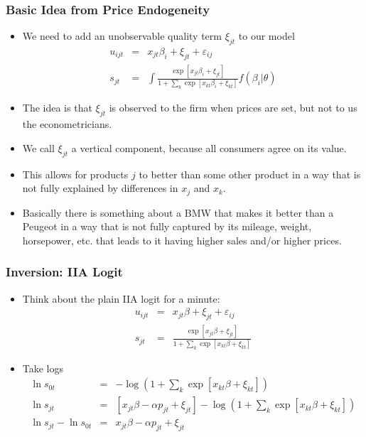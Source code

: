 \documentclass[xcolor=pdftex,dvipsnames,table,mathserif,aspectratio=169]{beamer}
\begin{document}
\begin{frame}
\frametitle{Basic Idea from Price Endogeneity}
 \begin{itemize}
\item We need to add an unobservable quality term $\xi_{jt}$ to our model
\begin{eqnarray*}
u_{ijt} &=& x_{jt} \beta_i + \xi_{jt} +  \varepsilon_{ij} \\
s_{jt} &=& \int \frac{\exp[x_{jt} \beta_i + \xi_{jt} ]}{1+\sum_k \exp[x_{kt} \beta_i + \xi_{kt} ]} f(\beta_i | \theta)
\end{eqnarray*}
\item The idea is that $\xi_{jt}$ is observed to the firm when prices are set, but not to us the econometricians.
\item We call $\xi_{jt}$ a vertical component, because all consumers agree on its value.
\item This allows for products $j$ to better than some other product in a way that is not fully explained by differences in $x_j$ and $x_k$.
\item Basically there is something about a BMW that makes it better than a Peugeot in a way that is not fully captured by its mileage, weight, horsepower, etc. that leads to it having higher sales and/or higher prices.
 \end{itemize}
\end{frame}

\begin{frame}
\frametitle{Inversion: IIA Logit}
 \begin{itemize}
\item Think about the plain IIA logit for a minute:
\begin{eqnarray*}
u_{ijt} &=& x_{jt} \beta + \xi_{jt} +  \varepsilon_{ij} \\
s_{jt} &=& \frac{\exp[x_{jt} \beta + \xi_{jt} ]}{1+\sum_k \exp[x_{kt} \beta + \xi_{kt} ]} 
\end{eqnarray*}
\item Take logs
\begin{eqnarray*}
\ln s_{0t} &=& -\log \left(1+\sum_k \exp[x_{kt} \beta + \xi_{kt}] \right) \\
\ln s_{jt} &=& [x_{jt} \beta - \alpha p_{jt} +  \xi_{jt} ] - \log \left(1+\sum_k \exp[x_{kt} \beta + \xi_{kt}] \right)\\
\ln s_{jt}- \ln s_{0t} &=& x_{jt} \beta -\alpha p_{jt} +  \xi_{jt}
\end{eqnarray*}
 \end{itemize}
\end{frame}
\end{document}

